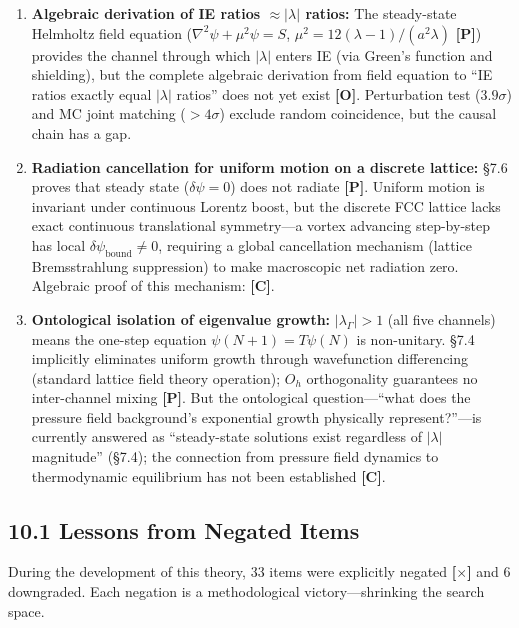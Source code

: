 \documentclass[11pt,a4paper]{article}
\newcommand{\gradeP}{\textbf{[P]}}
\newcommand{\gradeO}{\textbf{[O]}}
\newcommand{\gradeC}{\textbf{[C]}}
\newcommand{\gradeX}{\textbf{[$\times$]}}
\begin{document}
\begin{enumerate}[leftmargin=*]
\item \textbf{Algebraic derivation of IE ratios $\approx|\lambda|$ ratios:} The steady-state Helmholtz field equation ($\nabla^2\psi+\mu^2\psi=S$, $\mu^2=12(\lambda-1)/(a^2\lambda)$ \gradeP) provides the channel through which $|\lambda|$ enters IE (via Green's function and shielding), but the complete algebraic derivation from field equation to ``IE ratios exactly equal $|\lambda|$ ratios'' does not yet exist \gradeO. Perturbation test ($3.9\sigma$) and MC joint matching ($>4\sigma$) exclude random coincidence, but the causal chain has a gap.

\item \textbf{Radiation cancellation for uniform motion on a discrete lattice:} \S7.6 proves that steady state ($\delta\psi=0$) does not radiate \gradeP. Uniform motion is invariant under continuous Lorentz boost, but the discrete FCC lattice lacks exact continuous translational symmetry---a vortex advancing step-by-step has local $\delta\psi_{\mathrm{bound}}\neq 0$, requiring a global cancellation mechanism (lattice Bremsstrahlung suppression) to make macroscopic net radiation zero. Algebraic proof of this mechanism: \gradeC.

\item \textbf{Ontological isolation of eigenvalue growth:} $|\lambda_\Gamma|>1$ (all five channels) means the one-step equation $\psi(N{+}1)=T\psi(N)$ is non-unitary. \S7.4 implicitly eliminates uniform growth through wavefunction differencing (standard lattice field theory operation); $O_h$ orthogonality guarantees no inter-channel mixing \gradeP. But the ontological question---``what does the pressure field background's exponential growth physically represent?''---is currently answered as ``steady-state solutions exist regardless of $|\lambda|$ magnitude'' (\S7.4); the connection from pressure field dynamics to thermodynamic equilibrium has not been established \gradeC.
\end{enumerate}

\subsection{10.1 Lessons from Negated Items}

During the development of this theory, 33 items were explicitly negated \gradeX{} and 6 downgraded. Each negation is a methodological victory---shrinking the search space.
\end{document}
